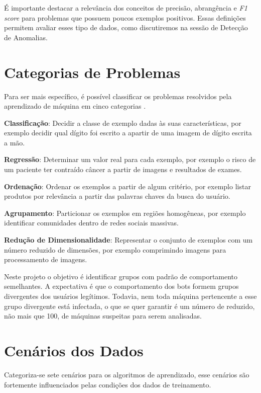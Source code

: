 É importante destacar a relevância dos conceitos de precisão, abrangência e \textit{F1 score} para problemas que possuem poucos exemplos positivos. Essas definições permitem avaliar esses tipo de dados, como discutiremos na sessão de Detecção de Anomalias.

\section{Categorias de Problemas}

Para ser mais específico, é possível classificar os problemas resolvidos pela aprendizado de máquina em cinco categorias \citep{mohri2012foundations}.

\begin{description}
\item \textbf{Classificação}: Decidir a classe de exemplo dadas às suas características, por exemplo decidir qual dígito foi escrito a apartir de uma imagem de dígito escrita a mão.
\item \textbf{Regressão}: Determinar um valor real para cada exemplo, por exemplo o risco de um paciente ter contraído câncer a partir de imagens e resultados de exames.
\item \textbf{Ordenação}: Ordenar os exemplos a partir de algum critério, por exemplo listar produtos por relevância a partir das palavras chaves da busca do usuário.
\item \textbf{Agrupamento}: Particionar os exemplos em regiões homogêneas, por exemplo identificar comunidades dentro de redes sociais massivas.
\item \textbf{Redução de Dimensionalidade}: Representar o conjunto de exemplos com um número reduzido de dimensões, por exemplo comprimindo imagens para processamento de imagens.
\end{description}

Neste projeto o objetivo é identificar grupos com padrão de comportamento semelhantes. A expectativa é que o comportamento dos bots formem grupos divergentes dos usuários legítimos. Todavia, nem toda máquina pertencente a esse grupo divergente está infectada, o que se quer garantir é um número de reduzido, não mais que 100, de máquinas suspeitas para serem analisadas.

\section{Cenários dos Dados}

Categoriza-se \citep{mohri2012foundations} sete cenários para os algoritmos de aprendizado, esse cenários são fortemente influenciados pelas condições dos dados de treinamento.

